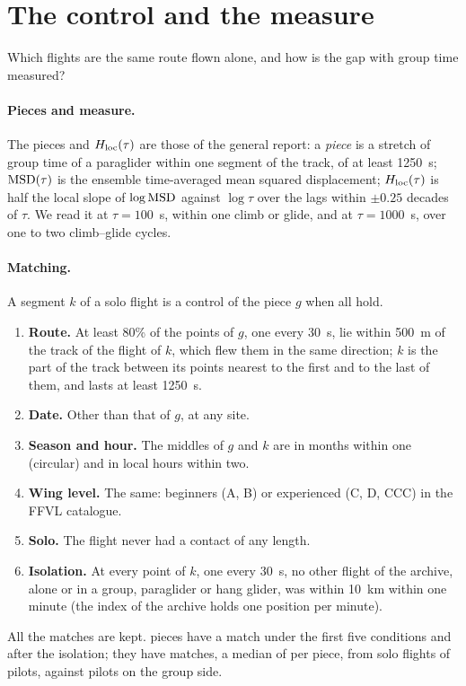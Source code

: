 \section{The control and the measure}\label{sec:matching}

Which flights are the same route flown alone, and how is the gap with group time measured?

\paragraph{Pieces and measure.} The pieces and $H_\mathrm{loc}(\tau)$ are those of the general report: a
\emph{piece} is a stretch of group time of a paraglider within one segment of the track, of at least
1250~s; $\mathrm{MSD}(\tau)$ is the ensemble time-averaged mean squared displacement; $H_\mathrm{loc}(\tau)$ is half
the local slope of $\log\mathrm{MSD}$ against $\log\tau$ over the lags within $\pm0.25$ decades of $\tau$. We
read it at $\tau=100$~s, within one climb or glide, and at $\tau=1000$~s, over one to two climb--glide
cycles.

\paragraph{Matching.} A segment $k$ of a solo flight is a control of the piece $g$ when all hold.
\begin{enumerate}[label=(\roman*)]
  \item \textbf{Route.} At least 80\% of the points of $g$, one every 30~s, lie within 500~m of the
        track of the flight of $k$, which flew them in the same direction; $k$ is the part of the track
        between its points nearest to the first and to the last of them, and lasts at least 1250~s.
  \item \textbf{Date.} Other than that of $g$, at any site.
  \item \textbf{Season and hour.} The middles of $g$ and $k$ are in months within one (circular) and
        in local hours within two.
  \item \textbf{Wing level.} The same: beginners (A, B) or experienced (C, D, CCC) in the FFVL
        catalogue.
  \item \textbf{Solo.} The flight never had a contact of any length.
  \item \textbf{Isolation.} At every point of $k$, one every 30~s, no other flight of the archive,
        alone or in a group, paraglider or hang glider, was within 10~km within one minute (the index
        of the archive holds one position per minute).
\end{enumerate}
All the matches are kept. \IsoPiecesBefore{} pieces have a match under the first five conditions
and \IsoPieces{} after the isolation; they have \IsoMatches{} matches, a median of \IsoMedianMatches{}
per piece, from \IsoSolo{} solo flights of \IsoPilotsControl{} pilots, against \IsoPilotsGroup{} pilots
on the group side.


